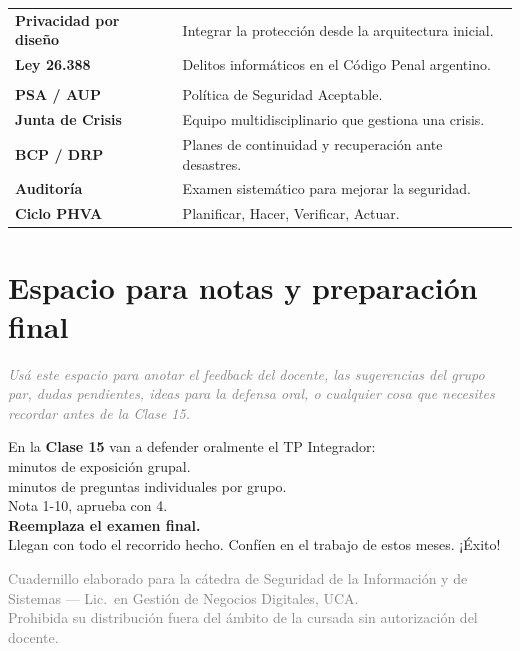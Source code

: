 \documentclass[12pt,a4paper]{article}
\begin{document}
\begin{tabularx}{\textwidth}{>{\bfseries}p{4cm}X}
Privacidad por dise\~no & Integrar la protecci\'on desde la arquitectura inicial. \\
Ley 26.388 & Delitos inform\'aticos en el C\'odigo Penal argentino. \\
\midrule
\multicolumn{2}{l}{\cellcolor{doradoFinal!10}\textbf{Unidad 4 --- Gobierno}} \\
PSA / AUP & Pol\'itica de Seguridad Aceptable. \\
Junta de Crisis & Equipo multidisciplinario que gestiona una crisis. \\
BCP / DRP & Planes de continuidad y recuperaci\'on ante desastres. \\
Auditor\'ia & Examen sistem\'atico para mejorar la seguridad. \\
Ciclo PHVA & Planificar, Hacer, Verificar, Actuar. \\
\bottomrule
\end{tabularx}

\newpage
\section{Espacio para notas y preparaci\'on final}

\begin{tcolorbox}[colback=grisClaro, colframe=gray!50, arc=2mm, height=10cm]
\textcolor{gray}{\itshape Us\'a este espacio para anotar el feedback del docente, las sugerencias del grupo par, dudas pendientes, ideas para la defensa oral, o cualquier cosa que necesites recordar antes de la Clase 15.}
\end{tcolorbox}

\vfill
\begin{cajaCierre}[title={¡\'Ultima etapa!}]
En la \textbf{Clase 15} van a defender oralmente el TP Integrador:\\[4pt]
 minutos de exposici\'on grupal.\\
 minutos de preguntas individuales por grupo.\\
\; Nota 1-10, aprueba con 4.\\
\; \textbf{Reemplaza el examen final.}\\[4pt]
Llegan con todo el recorrido hecho. Conf\'ien en el trabajo de estos meses. ¡\'Exito!
\end{cajaCierre}

\vspace{6pt}
\begin{center}
\small\textcolor{gray}{%
Cuadernillo elaborado para la c\'atedra de Seguridad de la Informaci\'on y de
Sistemas --- Lic.\ en Gesti\'on de Negocios Digitales, UCA.\\
Prohibida su distribuci\'on fuera del \'ambito de la cursada sin autorizaci\'on del docente.}
\end{center}
\end{document}
